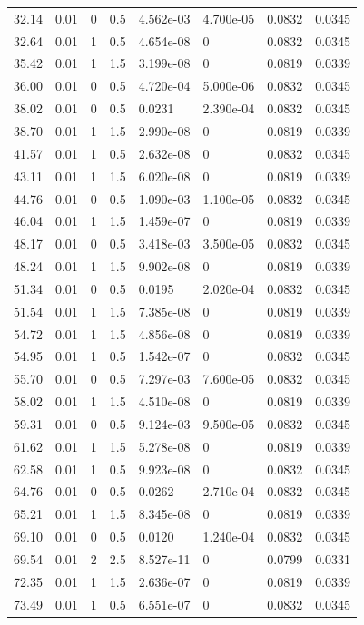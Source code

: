 \documentclass[preview]{standalone}
\begin{document}
{{\begin{tabular}{L{1.2cm}C{1.2cm} C{0.3cm}C{0.5cm} C{1.4cm}C{1.4cm} C{1.4cm}C{1.4cm}}
  32.14  &  0.01  & 0     & 0.5 &  4.562e-03  & 4.700e-05  & 0.0832 &  0.0345   \\ 
  32.64  &  0.01  & 1     & 0.5 &  4.654e-08  & 0  & 0.0832 &  0.0345   \\ 
  35.42  &  0.01  & 1     & 1.5 &  3.199e-08  & 0  & 0.0819 &  0.0339   \\ 
  36.00  &  0.01  & 0     & 0.5 &  4.720e-04  & 5.000e-06  & 0.0832 &  0.0345   \\ 
  38.02  &  0.01  & 0     & 0.5 &  0.0231  & 2.390e-04  & 0.0832 &  0.0345   \\ 
  38.70  &  0.01  & 1     & 1.5 &  2.990e-08  & 0  & 0.0819 &  0.0339   \\ 
  41.57  &  0.01  & 1     & 0.5 &  2.632e-08  & 0  & 0.0832 &  0.0345   \\ 
  43.11  &  0.01  & 1     & 1.5 &  6.020e-08  & 0  & 0.0819 &  0.0339   \\ 
  44.76  &  0.01  & 0     & 0.5 &  1.090e-03  & 1.100e-05  & 0.0832 &  0.0345   \\ 
  46.04  &  0.01  & 1     & 1.5 &  1.459e-07  & 0  & 0.0819 &  0.0339   \\ 
  48.17  &  0.01  & 0     & 0.5 &  3.418e-03  & 3.500e-05  & 0.0832 &  0.0345   \\ 
  48.24  &  0.01  & 1     & 1.5 &  9.902e-08  & 0  & 0.0819 &  0.0339   \\ 
  51.34  &  0.01  & 0     & 0.5 &  0.0195  & 2.020e-04  & 0.0832 &  0.0345   \\ 
  51.54  &  0.01  & 1     & 1.5 &  7.385e-08  & 0  & 0.0819 &  0.0339   \\ 
  54.72  &  0.01  & 1     & 1.5 &  4.856e-08  & 0  & 0.0819 &  0.0339   \\ 
  54.95  &  0.01  & 1     & 0.5 &  1.542e-07  & 0  & 0.0832 &  0.0345   \\ 
  55.70  &  0.01  & 0     & 0.5 &  7.297e-03  & 7.600e-05  & 0.0832 &  0.0345   \\ 
  58.02  &  0.01  & 1     & 1.5 &  4.510e-08  & 0  & 0.0819 &  0.0339   \\ 
  59.31  &  0.01  & 0     & 0.5 &  9.124e-03  & 9.500e-05  & 0.0832 &  0.0345   \\ 
  61.62  &  0.01  & 1     & 1.5 &  5.278e-08  & 0  & 0.0819 &  0.0339   \\ 
  62.58  &  0.01  & 1     & 0.5 &  9.923e-08  & 0  & 0.0832 &  0.0345   \\ 
  64.76  &  0.01  & 0     & 0.5 &  0.0262  & 2.710e-04  & 0.0832 &  0.0345   \\ 
  65.21  &  0.01  & 1     & 1.5 &  8.345e-08  & 0  & 0.0819 &  0.0339   \\ 
  69.10  &  0.01  & 0     & 0.5 &  0.0120  & 1.240e-04  & 0.0832 &  0.0345   \\ 
  69.54  &  0.01  & 2     & 2.5 &  8.527e-11  & 0  & 0.0799 &  0.0331   \\ 
  72.35  &  0.01  & 1     & 1.5 &  2.636e-07  & 0  & 0.0819 &  0.0339   \\ 
  73.49  &  0.01  & 1     & 0.5 &  6.551e-07  & 0  & 0.0832 &  0.0345   \\ 
\hline 
\end{tabular} 

}}
\end{document}

